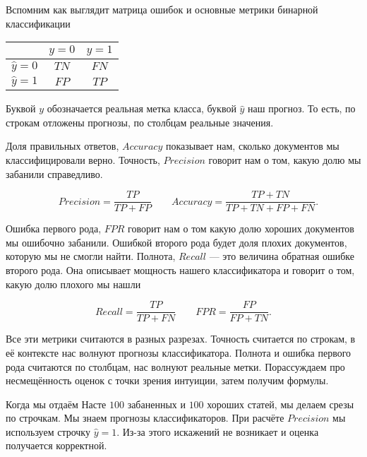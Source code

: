 \documentclass[12pt, a4paper, oneside]{article}
\begin{document}
 Вспомним как выглядит матрица ошибок и основные метрики бинарной классификации

\begin{center}
	\begin{tabular}{|c|c|c|}
		\hline
		& $y=0$  &  $ y = 1$ \\  \hline 
		$\hat y = 0$ & $TN$ & $FN$ \\ \hline 
		$\hat y = 1$ & $FP$ & $TP$ \\ \hline
	\end{tabular}
\end{center}

Буквой $y$ обозначается реальная метка класса, буквой $\hat y$ наш прогноз. То есть, по строкам отложены прогнозы, по столбцам реальные значения. 

Доля правильных ответов, $Accuracy$ показывает нам, сколько документов мы классифицировали верно. Точность, $Precision$ говорит нам о том, какую долю мы забанили справедливо. 

\begin{equation} 
\quad Precision = \frac{TP}{TP + FP} \qquad Accuracy = \frac{TP + TN}{TP + TN + FP + FN}.
\end{equation}

Ошибка первого рода, $FPR$ говорит нам о том какую долю хороших документов мы ошибочно забанили. Ошибкой второго рода будет доля плохих документов, которую мы не смогли найти. Полнота, $Recall$ --- это величина обратная ошибке второго рода. Она описывает мощность нашего классификатора и говорит о том, какую долю плохого мы нашли

\begin{equation} 
Recall = \frac{TP}{TP + FN} \qquad  FPR = \frac{FP}{FP + TN}. 
\end{equation}

Все эти метрики считаются в разных разрезах. Точность считается по строкам, в её контексте нас волнуют прогнозы классификатора. Полнота и ошибка первого рода считаются по столбцам, нас волнуют реальные метки. Порассуждаем про несмещённость оценок с точки зрения интуиции, затем получим формулы. 

Когда мы отдаём Насте $100$ забаненных и $100$ хороших статей, мы делаем срезы по строчкам. Мы знаем прогнозы классификаторов. При расчёте $Precision$ мы используем строчку $\hat y = 1$. Из-за этого искажений не возникает и оценка получается корректной. 
\end{document}
